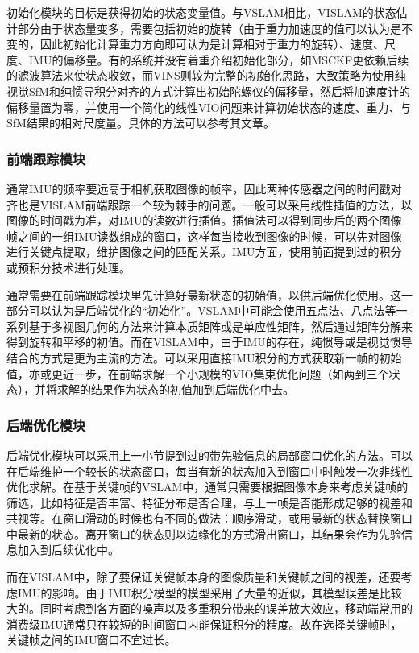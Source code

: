 初始化模块的目标是获得初始的状态变量值。与VSLAM相比，VISLAM的状态估计部分由于状态量变多，需要包括初始的旋转（由于重力加速度的值可以认为是不变的，因此初始化计算重力方向即可认为是计算相对于重力的旋转）、速度、尺度、IMU的偏移量。有的系统并没有着重介绍初始化部分，如MSCKF\citep{mourikis2007multi}更依赖后续的滤波算法来使状态收敛，而VINS\citep{li2017monocular}则较为完整的初始化思路，大致策略为使用纯视觉SfM和纯惯导积分对齐的方式计算出初始陀螺仪的偏移量，然后将加速度计的偏移量置为零，并使用一个简化的线性VIO问题来计算初始状态的速度、重力、与SfM结果的相对尺度量。具体的方法可以参考其文章。

\subsubsection*{前端跟踪模块}

通常IMU的频率要远高于相机获取图像的帧率，因此两种传感器之间的时间戳对齐也是VISLAM前端跟踪一个较为棘手的问题。一般可以采用线性插值的方法，以图像的时间戳为准，对IMU的读数进行插值。插值法可以得到同步后的两个图像帧之间的一组IMU读数组成的窗口，这样每当接收到图像的时候，可以先对图像进行关键点提取，维护图像之间的匹配关系。IMU方面，使用前面提到过的积分或预积分技术进行处理。

通常需要在前端跟踪模块里先计算好最新状态的初始值，以供后端优化使用。这一部分可以认为是后端优化的“初始化”。VSLAM中可能会使用五点法、八点法等一系列基于多视图几何的方法来计算本质矩阵或是单应性矩阵，然后通过矩阵分解来得到旋转和平移的初值。而在VISLAM中，由于IMU的存在，纯惯导或是视觉惯导结合的方式是更为主流的方法。可以采用直接IMU积分的方式获取新一帧的初始值，亦或更近一步，在前端求解一个小规模的VIO集束优化问题（如两到三个状态），并将求解的结果作为状态的初值加到后端优化中去。

\subsubsection*{后端优化模块}

后端优化模块可以采用上一小节提到过的带先验信息的局部窗口优化的方法。可以在后端维护一个较长的状态窗口，每当有新的状态加入到窗口中时触发一次非线性优化求解。在基于关键帧的VSLAM中，通常只需要根据图像本身来考虑关键帧的筛选，比如特征是否丰富、特征分布是否合理，与上一帧是否能形成足够的视差和共视等。在窗口滑动的时候也有不同的做法：顺序滑动，或用最新的状态替换窗口中最新的状态。离开窗口的状态则以边缘化的方式滑出窗口，其结果会作为先验信息加入到后续优化中。

而在VISLAM中，除了要保证关键帧本身的图像质量和关键帧之间的视差，还要考虑IMU的影响。由于IMU积分模型的模型采用了大量的近似，其模型误差是比较大的。同时考虑到各方面的噪声以及多重积分带来的误差放大效应，移动端常用的消费级IMU通常只在较短的时间窗口内能保证积分的精度。故在选择关键帧时，关键帧之间的IMU窗口不宜过长。

